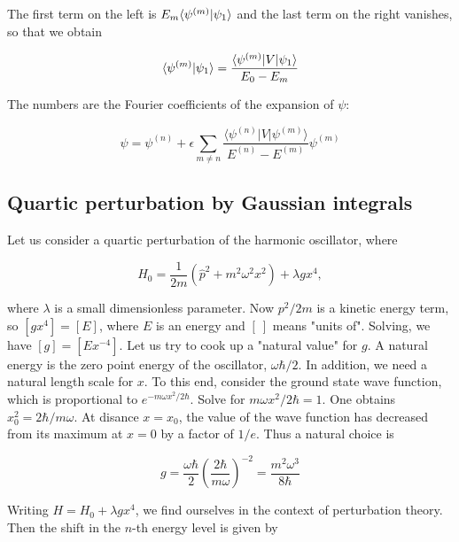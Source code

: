 The first term on the left is $E_m\langle \psi^{(m)} | \psi_1 \rangle$ and the last term on the right vanishes, so that we obtain

\begin{equation}
\label{perturbation-fourier-coefficients}
  \langle \psi^{(m)} | \psi_1 \rangle
  = \frac{\langle \psi^{(m)} | V | \psi_1 \rangle}{E_0 - E_m}
\end{equation}

The numbers are the Fourier coefficients of the expansion of $\psi$:

\begin{equation}
\label{perturbation-fourier-expansion}
  \psi = \psi^{(n)} 
+ \epsilon \sum_{m \ne n} \frac{\langle \psi^{(n)} | V | \psi^{(m)} \rangle}{  E^{(n)} - E^{(m)}  }\psi^{(m)} 
\end{equation}

\subsection{Quartic perturbation by Gaussian integrals}


Let us consider a quartic perturbation of the harmonic oscillator, where 

\begin{equation}
H_0 = \frac{1}{2m}(\hat p^2 + m^2 \omega^2 x^2) +  \lambda g x^4,
\end{equation}

where $\lambda$ is a small dimensionless parameter.  Now $p^2/2m$ is a kinetic energy term, so $[gx^4] = [E]$, where $E$ is an energy and $[\  ]$ means "units of". Solving, we have $[g] = [Ex^{-4}]$.  Let us try to cook up a "natural value" for $g$.  A natural energy is the zero point energy of the oscillator, $\omega\hbar/2$.  In addition, we need a natural length scale for $x$.  To this end, consider the ground state wave function, which is proportional to $e^{-m\omega x^2/2\hbar}$.  Solve for $m\omega x^2/2\hbar = 1$. One obtains $x_0^2 = 2\hbar/m\omega$. At disance $x = x_0$, the value of the wave function has decreased from its maximum at $x = 0$ by a factor of $1/e$. Thus a natural choice is 

\begin{equation}
g = \frac{\omega\hbar}{2}\left(\frac{2\hbar}{m\omega}\right)^{-2} = \frac{m^2 \omega^3}{8\hbar}
\end{equation}


Writing $H= H_0 + \lambda g x^4$, we find ourselves in the context of perturbation theory. Then the shift in the $n$-th energy level is given by 

